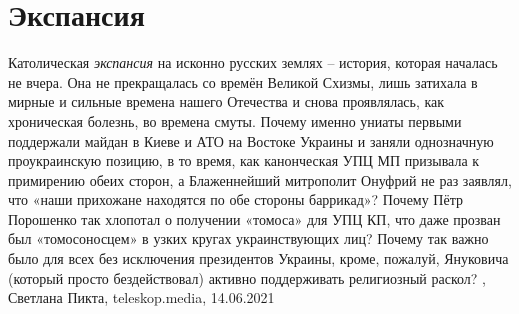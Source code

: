  
 
 
 
 
\chapter{Экспансия}

Католическая \emph{экспансия} на исконно русских землях – история, которая началась не
вчера. Она не прекращалась со времён Великой Схизмы, лишь затихала в мирные и
сильные времена нашего Отечества и снова проявлялась, как хроническая болезнь,
во времена смуты. Почему именно униаты первыми поддержали майдан в Киеве и АТО
на Востоке Украины и заняли однозначную проукраинскую позицию, в то время, как
канонческая УПЦ МП призывала к примирению обеих сторон, а Блаженнейший
митрополит Онуфрий не раз заявлял, что «наши прихожане находятся по обе стороны
баррикад»? Почему Пётр Порошенко так хлопотал о получении «томоса» для УПЦ КП,
что даже прозван был «томосоносцем» в узких кругах украинствующих лиц?  Почему
так важно было для всех без исключения президентов Украины, кроме, пожалуй,
Януковича (который просто бездействовал) активно поддерживать религиозный
раскол?
, 
Светлана Пикта, teleskop.media, 14.06.2021


